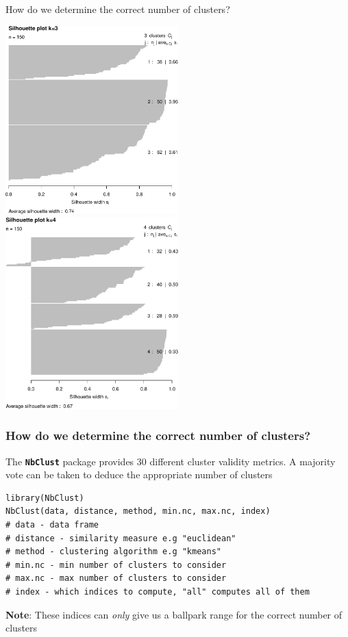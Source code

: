 \documentclass[pdf]{beamer}
\begin{document}
\begin{frame}{How do we determine the correct number of clusters?}
\begin{center}
	\includegraphics[width=0.5\textwidth]{silhK3.pdf}	
	\includegraphics[width=0.5\textwidth]{silhK4.pdf}
\end{center}
\end{frame}



\begin{frame}[fragile]
\frametitle{How do we determine the correct number of clusters?}
The \textbf{\texttt{NbClust}} package provides 30 different cluster validity metrics. A majority vote can be
taken to deduce the appropriate number of clusters
\vfill
\begin{lstlisting}[style=RCode]
library(NbClust)
NbClust(data, distance, method, min.nc, max.nc, index)
# data - data frame 
# distance - similarity measure e.g "euclidean"
# method - clustering algorithm e.g "kmeans"
# min.nc - min number of clusters to consider
# max.nc - max number of clusters to consider
# index - which indices to compute, "all" computes all of them
\end{lstlisting}
\vfill
\textbf{Note}: These indices can \textit{only} give us a ballpark range for the correct number of clusters
\end{frame}
\end{document}
